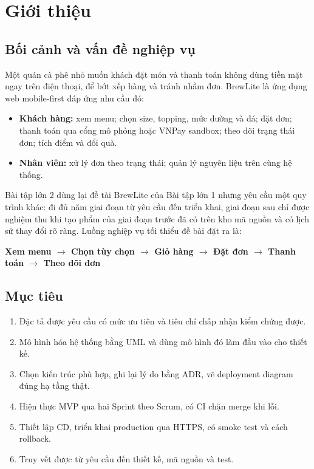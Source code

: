 \section{Giới thiệu}\label{ch:gioithieu}

\subsection{Bối cảnh và vấn đề nghiệp vụ}
Một quán cà phê nhỏ muốn khách đặt món và thanh toán không dùng tiền mặt ngay trên điện thoại, để bớt xếp hàng và tránh nhầm đơn. BrewLite là ứng dụng web mobile-first đáp ứng nhu cầu đó:

\begin{itemize}
\item \textbf{Khách hàng:} xem menu; chọn size, topping, mức đường và đá; đặt đơn; thanh toán qua cổng mô phỏng hoặc VNPay sandbox; theo dõi trạng thái đơn; tích điểm và đổi quà.
\item \textbf{Nhân viên:} xử lý đơn theo trạng thái; quản lý nguyên liệu trên cùng hệ thống.
\end{itemize}

Bài tập lớn 2 dùng lại đề tài BrewLite của Bài tập lớn 1 nhưng yêu cầu một quy trình khác: đi đủ năm giai đoạn từ yêu cầu đến triển khai, giai đoạn sau chỉ được nghiệm thu khi tạo phẩm của giai đoạn trước đã có trên kho mã nguồn và có lịch sử thay đổi rõ ràng. Luồng nghiệp vụ tối thiểu đề bài đặt ra là:

\begin{center}
\textbf{Xem menu $\rightarrow$ Chọn tùy chọn $\rightarrow$ Giỏ hàng $\rightarrow$ Đặt đơn $\rightarrow$ Thanh toán $\rightarrow$ Theo dõi đơn}
\end{center}

\subsection{Mục tiêu}
\begin{enumerate}
\item Đặc tả được yêu cầu có mức ưu tiên và tiêu chí chấp nhận kiểm chứng được.
\item Mô hình hóa hệ thống bằng UML và dùng mô hình đó làm đầu vào cho thiết kế.
\item Chọn kiến trúc phù hợp, ghi lại lý do bằng ADR, vẽ deployment diagram đúng hạ tầng thật.
\item Hiện thực MVP qua hai Sprint theo Scrum, có CI chặn merge khi lỗi.
\item Thiết lập CD, triển khai production qua HTTPS, có smoke test và cách rollback.
\item Truy vết được từ yêu cầu đến thiết kế, mã nguồn và test.
\end{enumerate}

